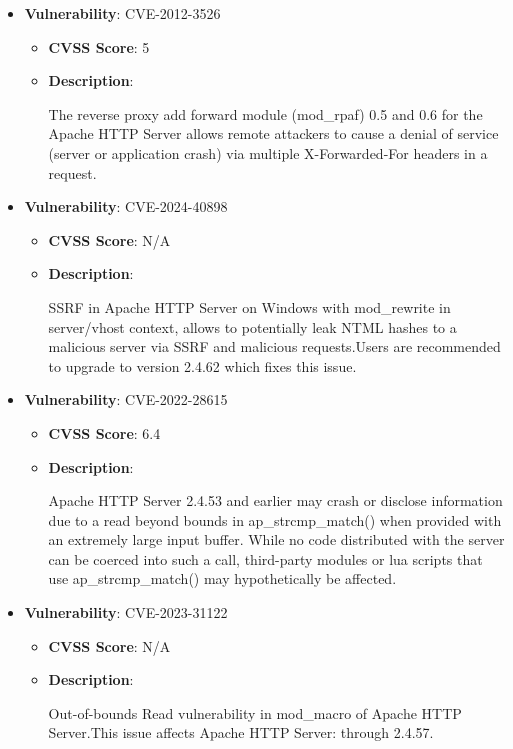 \documentclass{article}
\begin{document}
\begin{itemize}
        \item \textbf{Vulnerability}: CVE-2012-3526
        \begin{itemize}
            \item \textbf{CVSS Score}:  5 
            \item \textbf{Description}:
            \parbox[t]{0.9\linewidth}{
                \ttfamily The reverse proxy add forward module (mod\_rpaf) 0.5 and 0.6 for the Apache HTTP Server allows remote attackers to cause a denial of service (server or application crash) via multiple X-Forwarded-For headers in a request.
            }
        \end{itemize}
    
        \item \textbf{Vulnerability}: CVE-2024-40898
        \begin{itemize}
            \item \textbf{CVSS Score}:  N/A 
            \item \textbf{Description}:
            \parbox[t]{0.9\linewidth}{
                \ttfamily SSRF in Apache HTTP Server on Windows with mod\_rewrite in server/vhost context, allows to potentially leak NTML hashes to a malicious server via SSRF and malicious requests.Users are recommended to upgrade to version 2.4.62 which fixes this issue.
            }
        \end{itemize}
    
        \item \textbf{Vulnerability}: CVE-2022-28615
        \begin{itemize}
            \item \textbf{CVSS Score}:  6.4 
            \item \textbf{Description}:
            \parbox[t]{0.9\linewidth}{
                \ttfamily Apache HTTP Server 2.4.53 and earlier may crash or disclose information due to a read beyond bounds in ap\_strcmp\_match() when provided with an extremely large input buffer. While no code distributed with the server can be coerced into such a call, third-party modules or lua scripts that use ap\_strcmp\_match() may hypothetically be affected.
            }
        \end{itemize}
    
        \item \textbf{Vulnerability}: CVE-2023-31122
        \begin{itemize}
            \item \textbf{CVSS Score}:  N/A 
            \item \textbf{Description}:
            \parbox[t]{0.9\linewidth}{
                \ttfamily Out-of-bounds Read vulnerability in mod\_macro of Apache HTTP Server.This issue affects Apache HTTP Server: through 2.4.57.
            }
        \end{itemize}
    
\end{itemize}
\end{document}
